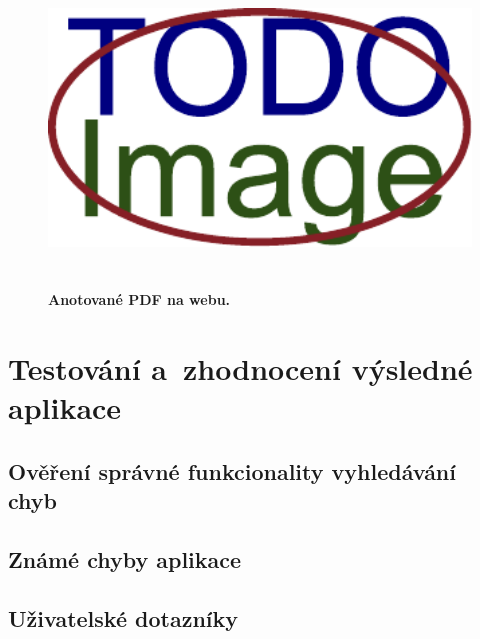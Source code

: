 \begin{figure}[H]
    \centering
    \includegraphics[width=\linewidth,height=3.3in]{obrazky-figures/placeholder.pdf}
    \caption{\textbf{Anotované PDF na webu.} }
\end{figure}





\chapter{Testování a~zhodnocení výsledné aplikace}

\dummyShortText[10]


\section{Ověření správné funkcionality vyhledávání chyb}


\section{Známé chyby aplikace}


\section{Uživatelské dotazníky}


